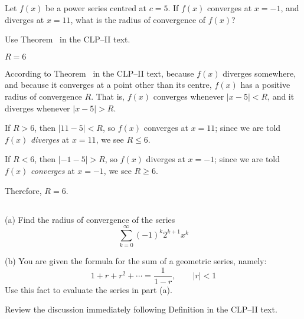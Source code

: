 \begin{Mquestion}
	Let $f(x)$ be a power series centred at $c=5$. If $f(x)$ converges at $x=-1$, and diverges at $x=11$, what is the radius of convergence of $f(x)$?
\end{Mquestion}
\begin{hint}
	Use Theorem~ in the CLP--II text.
\end{hint}
\begin{answer}
	$R=6$
\end{answer}
\begin{solution}
	According to Theorem~ in the CLP--II text, because $f(x)$ diverges somewhere, and because it converges at a point other than its centre,  $f(x)$ has a positive radius of convergence $R$. That is, $f(x)$ converges whenever $|x-5|<R$, and it diverges whenever $|x-5|>R$.

	If $R>6$, then $|11-5|<R$, so $f(x)$ converges at $x=11$; since we are told $f(x)$ \emph{diverges} at $x=11$, we see $R \le 6$.

	If $R<6$, then $|-1-5|>R$, so $f(x)$ diverges at $x=-1$; since we are told $f(x)$ \emph{converges} at $x=-1$, we see $R \ge 6$.

	Therefore, $R=6$.
\end{solution}









\subsection*{\Procedural}

\begin{Mquestion}[M105 2012A]
(a) Find the radius of convergence of the series
\begin{equation*}
\sum_{k=0}^\infty (-1)^k 2^{k+1} x^k
\end{equation*}

\noindent (b)
You are given the formula for the sum of a geometric series, namely:
\begin{equation*}
1+r+r^2 + \cdots =\frac{1}{1-r},\qquad|r|<1
\end{equation*}
Use this fact to evaluate the series in part (a).
\end{Mquestion}

\begin{hint}
Review the discussion immediately following Definition
 in the
CLP--II text.
\end{hint}


